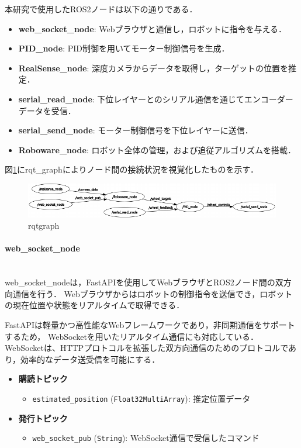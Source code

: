 本研究で使用したROS2ノードは以下の通りである．
\begin{itemize}
    \item \textbf{web\_socket\_node}: Webブラウザと通信し，ロボットに指令を与える．
    \item \textbf{PID\_node}: PID制御を用いてモーター制御信号を生成．
    \item \textbf{RealSense\_node}: 深度カメラからデータを取得し，ターゲットの位置を推定．
    \item \textbf{serial\_read\_node}: 下位レイヤーとのシリアル通信を通じてエンコーダーデータを受信．
    \item \textbf{serial\_send\_node}: モーター制御信号を下位レイヤーに送信．
    \item \textbf{Roboware\_node}: ロボット全体の管理，および追従アルゴリズムを搭載．
\end{itemize}

図\ref{fig:rqt}にrqt\_graphによりノード間の接続状況を視覚化したものを示す．

\begin{figure}[H]
    \centering
    \includegraphics[width=1.0\textwidth]{figure/rqtgraph_v1.4.pdf}
    \caption{rqtgraph}
    \label{fig:rqt}
\end{figure}


\paragraph{web\_socket\_node}\mbox{}\\
web\_socket\_nodeは，FastAPIを使用してWebブラウザとROS2ノード間の双方向通信を行う．
Webブラウザからはロボットの制御指令を送信でき，ロボットの現在位置や状態をリアルタイムで取得できる．

FastAPIは軽量かつ高性能なWebフレームワークであり，非同期通信をサポートするため，
WebSocketを用いたリアルタイム通信にも対応している．
WebSocketは、HTTPプロトコルを拡張した双方向通信のためのプロトコルであり，効率的なデータ送受信を可能にする．

\begin{itemize}
    \item \textbf{購読トピック}
          \begin{itemize}
              \item \texttt{estimated\_position} (\texttt{Float32MultiArray}): 推定位置データ
          \end{itemize}
    \item \textbf{発行トピック}
          \begin{itemize}
              \item \texttt{web\_socket\_pub} (\texttt{String}): WebSocket通信で受信したコマンド
          \end{itemize}
\end{itemize}


